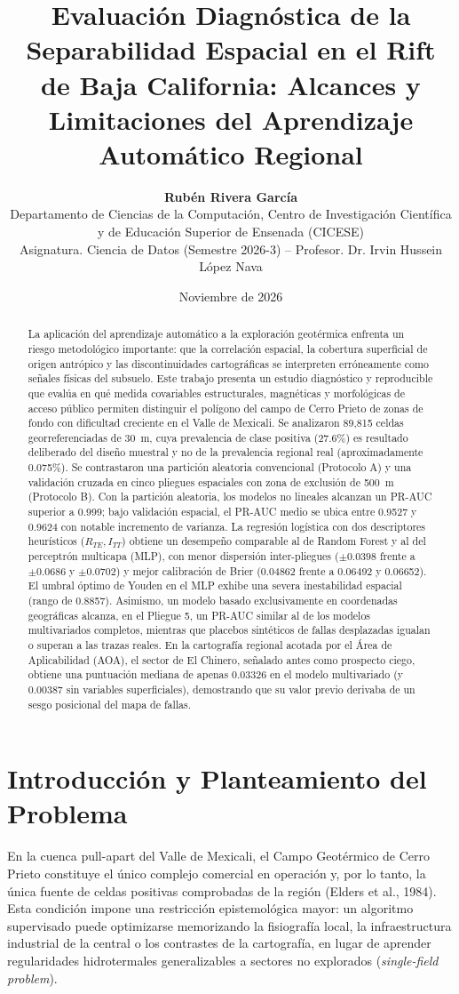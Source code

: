 \documentclass[10pt,twocolumn,a4paper]{article}
\title{\vspace{-0.85cm}\textbf{\Large Evaluación Diagnóstica de la Separabilidad Espacial en el Rift de Baja California: Alcances y Limitaciones del Aprendizaje Automático Regional}}
\author{\textbf{Rubén Rivera García}\\
\small Departamento de Ciencias de la Computación, Centro de Investigación Científica y de Educación Superior de Ensenada (CICESE)\\
\small Asignatura. Ciencia de Datos (Semestre 2026-3) -- Profesor. Dr. Irvin Hussein López Nava}
\date{Noviembre de 2026\vspace{-0.45cm}}
\begin{document}
\maketitle

\begin{abstract}
\noindent La aplicación del aprendizaje automático a la exploración geotérmica enfrenta un riesgo metodológico importante: que la correlación espacial, la cobertura superficial de origen antrópico y las discontinuidades cartográficas se interpreten erróneamente como señales físicas del subsuelo. Este trabajo presenta un estudio diagnóstico y reproducible que evalúa en qué medida covariables estructurales, magnéticas y morfológicas de acceso público permiten distinguir el polígono del campo de Cerro Prieto de zonas de fondo con dificultad creciente en el Valle de Mexicali. Se analizaron 89,815 celdas georreferenciadas de 30~m, cuya prevalencia de clase positiva (27.6\%) es resultado deliberado del diseño muestral y no de la prevalencia regional real (aproximadamente 0.075\%). Se contrastaron una partición aleatoria convencional (Protocolo A) y una validación cruzada en cinco pliegues espaciales con zona de exclusión de 500~m (Protocolo B). Con la partición aleatoria, los modelos no lineales alcanzan un PR-AUC superior a 0.999; bajo validación espacial, el PR-AUC medio se ubica entre 0.9527 y 0.9624 con notable incremento de varianza. La regresión logística con dos descriptores heurísticos ($R_{TE}, I_{TT}$) obtiene un desempeño comparable al de Random Forest y al del perceptrón multicapa (MLP), con menor dispersión inter-pliegues ($\pm 0.0398$ frente a $\pm 0.0686$ y $\pm 0.0702$) y mejor calibración de Brier (0.04862 frente a 0.06492 y 0.06652). El umbral óptimo de Youden en el MLP exhibe una severa inestabilidad espacial (rango de 0.8857). Asimismo, un modelo basado exclusivamente en coordenadas geográficas alcanza, en el Pliegue 5, un PR-AUC similar al de los modelos multivariados completos, mientras que placebos sintéticos de fallas desplazadas igualan o superan a las trazas reales. En la cartografía regional acotada por el Área de Aplicabilidad (AOA), el sector de El Chinero, señalado antes como prospecto ciego, obtiene una puntuación mediana de apenas 0.03326 en el modelo multivariado (y 0.00387 sin variables superficiales), demostrando que su valor previo derivaba de un sesgo posicional del mapa de fallas.
\end{abstract}

\section{Introducción y Planteamiento del Problema}
En la cuenca pull-apart del Valle de Mexicali, el Campo Geotérmico de Cerro Prieto constituye el único complejo comercial en operación y, por lo tanto, la única fuente de celdas positivas comprobadas de la región (Elders et al., 1984). Esta condición impone una restricción epistemológica mayor: un algoritmo supervisado puede optimizarse memorizando la fisiografía local, la infraestructura industrial de la central o los contrastes de la cartografía, en lugar de aprender regularidades hidrotermales generalizables a sectores no explorados (\textit{single-field problem}).
\end{document}
